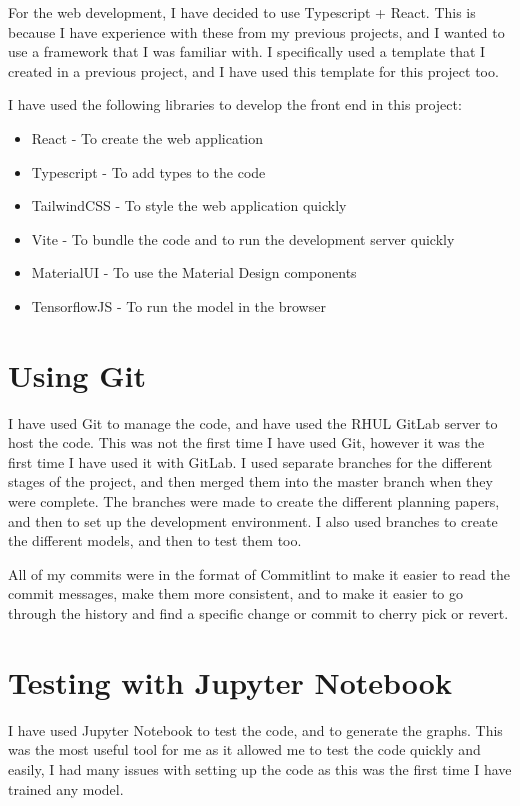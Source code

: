 \documentclass[]{final_report}
\begin{document}
For the web development, I have decided to use Typescript + React. This is because I have experience with these from my previous projects, and I wanted to use a framework that I was familiar with. I specifically used a template\cite{TypescriptProjectTemplate} that I created in a previous project, and I have used this template for this project too.

I have used the following libraries to develop the front end in this project:
\begin{itemize}
  \item React\cite{React} - To create the web application
  \item Typescript\cite{Typescript} - To add types to the code
  \item TailwindCSS\cite{tailwindcss} - To style the web application quickly
  \item Vite\cite{Vite} - To bundle the code and to run the development server quickly
  \item MaterialUI\cite{MaterialUI} - To use the Material Design components
  \item TensorflowJS\cite{TensorflowJS} - To run the model in the browser
\end{itemize}


\section{Using Git}
I have used Git to manage the code, and have used the RHUL GitLab server to host the code.
This was not the first time I have used Git, however it was the first time I have used it with GitLab.
I used separate branches for the different stages of the project, and then merged them into the master branch when they were complete.
The branches were made to create the different planning papers, and then to set up the development environment.
I also used branches to create the different models, and then to test them too.

All of my commits were in the format of Commitlint\cite{CommitLint} to make it easier to read the commit messages, make them more consistent,
and to make it easier to go through the history and find a specific change or commit to cherry pick or revert.

\section{Testing with Jupyter Notebook}
I have used Jupyter Notebook to test the code, and to generate the graphs.
This was the most useful tool for me as it allowed me to test the code quickly and easily,
I had many issues with setting up the code as this was the first time I have trained any model.
\end{document}
